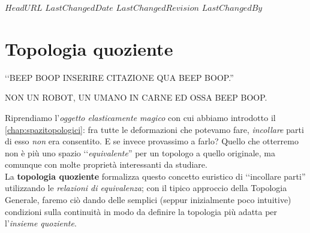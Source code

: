 \svnidlong
{$HeadURL$}
{$LastChangedDate$}
{$LastChangedRevision$}
{$LastChangedBy$}

\chapter{Topologia quoziente}

\begin{introduction}
‘‘BEEP BOOP INSERIRE CITAZIONE QUA BEEP BOOP.''
\begin{flushright}
	\textsc{NON UN ROBOT,} UN UMANO IN CARNE ED OSSA BEEP BOOP.
\end{flushright}
\end{introduction}
\noindent Riprendiamo l'\textit{oggetto elasticamente magico} con cui abbiamo introdotto il \autoref{chap:spazitopologici}: fra tutte le deformazioni che potevamo fare, \textit{incollare} parti di esso \textit{non} era consentito. E se invece provassimo a farlo? Quello che otterremo non è più uno spazio ‘‘\textit{equivalente}'' per un topologo a quello originale, ma comunque con molte proprietà interessanti da studiare.\\
La \textbf{topologia quoziente} formalizza questo concetto euristico di ‘‘incollare parti'' utilizzando le \textit{relazioni di equivalenza}; con il tipico approccio della Topologia Generale, faremo ciò dando delle semplici (seppur inizialmente poco intuitive) condizioni sulla continuità in modo da definire la topologia più adatta per l'\textit{insieme quoziente}.

